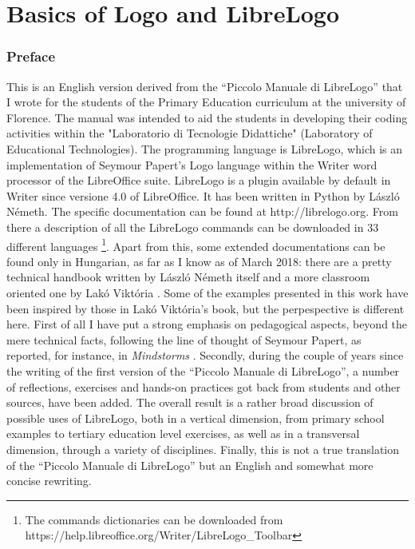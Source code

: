 \part{Basics of Logo and LibreLogo} \label{parte:manuale}

\section{Preface}

This is an English version derived from the “Piccolo Manuale di LibreLogo” that
I wrote for the students of the Primary Education curriculum at the university
of Florence. The manual was intended to aid the students in developing their
coding activities within the "Laboratorio di Tecnologie Didattiche" (Laboratory
of Educational Technologies). The programming language is LibreLogo, which is
an implementation of Seymour Papert's Logo language within the Writer word
processor of the LibreOffice  suite. LibreLogo is a plugin available by default
in Writer since versione 4.0 of LibreOffice. It has been written in Python by
László Németh. The specific documentation can be found at http://librelogo.org.
From there a description of all the LibreLogo commands can be downloaded in 33
different languages \footnote{The commands dictionaries can be downloaded from
https://help.libreoffice.org/Writer/LibreLogo\_Toolbar}. Apart from this, some
extended documentations can be found only in Hungarian, as far as I know as of
March 2018: there are a pretty technical handbook written by László Németh
itself \cite{LibreLogo2} and a more classroom oriented one by Lakó Viktória
\cite{LibreLogo3}. Some of the examples presented in this work have been
inspired by those in  Lakó Viktória's book,  but the perpespective is different
here. First of all I have put  a strong emphasis on pedagogical aspects, beyond
the mere technical facts, following the line of thought of Seymour Papert, as
reported, for instance, in \textit{Mindstorms} \cite{Papert}. Secondly, during
the couple of years since the writing of the first version of the “Piccolo
Manuale di LibreLogo”,  a number of reflections, exercises and hands-on
practices got back from students and other sources, have been added. The
overall result is a rather broad discussion of possible uses of LibreLogo, both
in a vertical dimension, from primary school examples to tertiary education
level exercises, as well as in a transversal dimension, through a variety of
disciplines. Finally, this is not a true translation of the “Piccolo Manuale di
LibreLogo” but an English and somewhat more concise rewriting.


